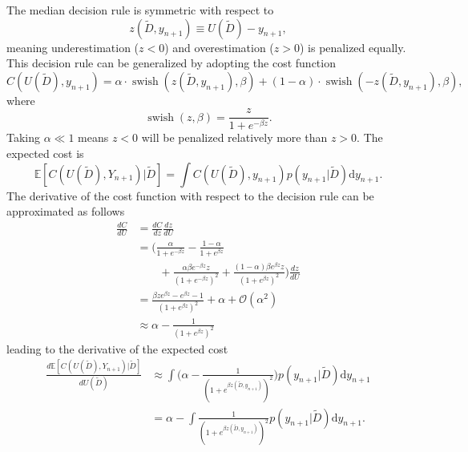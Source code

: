 \begin{example}
	The median decision rule is symmetric with respect to
	\begin{equation}
		z(\tilde{D},y_{n+1}) \equiv U(\tilde{D})-y_{n+1},
	\end{equation}
	meaning underestimation ($z<0$) and overestimation ($z>0$) is penalized equally. This decision rule can be generalized by adopting the cost function
	\begin{equation}
		C(U(\tilde{D}), y_{n+1}) = \alpha\cdot \operatorname{swish}(z(\tilde{D},y_{n+1}),\beta)
		+(1-\alpha)\cdot \operatorname{swish}(-z(\tilde{D},y_{n+1}),\beta),
	\end{equation}
	where
	\begin{equation}
		\operatorname{swish}(z,\beta) = \frac{z}{1+e^{-\beta z}}.
	\end{equation}
	Taking $\alpha \ll 1$ means $z<0$ will be penalized relatively more than $z>0$. The expected cost is
	\begin{equation}
		\mathbb{E}[C(U(\tilde{D}), Y_{n+1})|\tilde{D}] = \int C(U(\tilde{D}),y_{n+1}) p(y_{n+1}|\tilde{D})\mathrm{d}y_{n+1}.
	\end{equation}
	The derivative of the cost function with respect to the decision rule can be approximated as follows
	\begin{equation}
		\begin{split}
			\frac{dC}{dU} & = \frac{dC}{dz}\frac{dz}{dU}\\
			& = \bigg(\frac{\alpha}{1+e^{-\beta z}}-\frac{1-\alpha}{1+e^{\beta z}}\\
			&\qquad+\frac{\alpha\beta e^{-\beta z}z}{(1+e^{-\beta z})^2}+\frac{(1-\alpha)\beta e^{\beta z}z}{(1+e^{\beta z})^2}\bigg)\frac{dz}{dU}\\
			&= \frac{\beta z e^{\beta z}-e^{\beta z}-1}{(1+e^{\beta z})^2}+\alpha+\mathcal{O}(\alpha^2)\\
			&\approx  \alpha -\frac{1}{(1+e^{\beta z})^2}
		\end{split}
	\end{equation}
	leading to the derivative of the expected cost
	\begin{equation}
		\begin{split}
			\frac{d\mathbb{E}[C(U(\tilde{D}), Y_{n+1})|\tilde{D}]}{dU(\tilde{D})} &\approx \int \bigg(\alpha -\frac{1}{(1+e^{\beta z(\tilde{D},y_{n+1})})^2}\bigg)p(y_{n+1}|\tilde{D}) \mathrm{d}y_{n+1}\\
			& = \alpha -\int \frac{1}{(1+e^{\beta z(\tilde{D},y_{n+1})})^2}p(y_{n+1}|\tilde{D}) \mathrm{d} y_{n+1}.\\

\end{split}
\end{equation}
\end{example}
